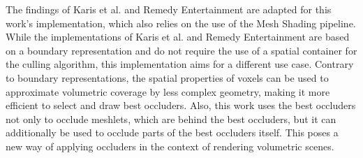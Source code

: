 \noindent
The findings of Karis et al. and Remedy Entertainment are adapted for this work's implementation, which also relies on 
the use of the Mesh Shading pipeline. While the implementations of Karis et al. and Remedy Entertainment are based on 
a boundary representation and do not require the use of a spatial container for the culling algorithm, this 
implementation aims for a different use case. Contrary to boundary representations, the spatial properties of voxels 
can be used to approximate volumetric coverage by less complex geometry, making it more efficient to select and draw 
best occluders. Also, this work uses the best occluders not only to occlude meshlets, which are behind the best occluders, 
but it can additionally be used to occlude parts of the best occluders itself. This poses a new way of applying occluders 
in the context of rendering volumetric scenes.


